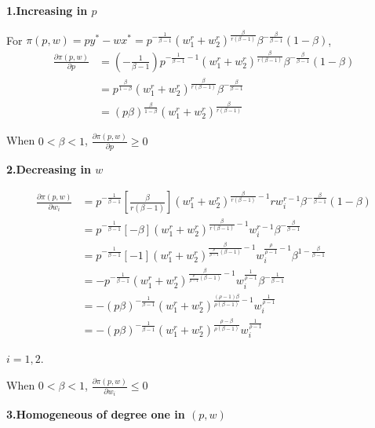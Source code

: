 \documentclass{article}
\begin{document}
\textbf{1.Increasing in $p$}

For $\pi(p,w) = py^* - wx^* = p^{-\frac{1}{\beta - 1}} (w_1^r + w_2^r)^{\frac{\beta}{r(\beta - 1)}}\beta^{-\frac{\beta}{\beta - 1}}(1-\beta)$,
\begin{align*}
\frac{\partial \pi(p, w)}{\partial p} &= (-\frac{1}{\beta - 1})p^{-\frac{1}{\beta - 1}-1} (w_1^r + w_2^r)^{\frac{\beta}{r(\beta - 1)}}\beta^{-\frac{\beta}{\beta - 1}}(1-\beta) \\
&= p^{\frac{\beta}{1 - \beta}} (w_1^r + w_2^r)^{\frac{\beta}{r(\beta - 1)}}\beta^{-\frac{\beta}{\beta - 1}} \\
&= (p\beta)^{\frac{\beta}{1 - \beta}} (w_1^r + w_2^r)^{\frac{\beta}{r(\beta - 1)}}
\end{align*}

When $0<\beta <1$, $\frac{\partial \pi(p, w)}{\partial p} \ge 0 $

\vspace{3mm}
\textbf{2.Decreasing in $w$}

\begin{align*}
\frac{\partial \pi(p, w)}{\partial w_i} &= 
p^{-\frac{1}{\beta - 1}} [\frac{\beta}{r(\beta - 1)}](w_1^r + w_2^r)^{\frac{\beta}{r(\beta - 1)} -1} r w_i^{r-1}\beta^{-\frac{\beta}{\beta - 1}}(1-\beta) \\
&= p^{-\frac{1}{\beta - 1}} [-\beta](w_1^r + w_2^r)^{\frac{\beta}{r(\beta - 1)} -1} w_i^{r-1}\beta^{-\frac{\beta}{\beta - 1}} \\
&= p^{-\frac{1}{\beta - 1}} [-1](w_1^r + w_2^r)^{\frac{\beta}{\frac{\rho}{\rho -1}(\beta - 1)} -1} w_i^{\frac{\rho}{\rho -1}-1}\beta^{1-\frac{\beta}{\beta - 1}} \\
&= -p^{-\frac{1}{\beta - 1}}(w_1^r + w_2^r)^{\frac{\beta}{\frac{\rho}{\rho -1}(\beta - 1)} -1} w_i^{\frac{1}{\rho -1}}\beta^{-\frac{1}{\beta - 1}} \\
&= -(p\beta)^{-\frac{1}{\beta - 1}}(w_1^r + w_2^r)^{\frac{(\rho -1)\beta}{\rho(\beta - 1)} -1} w_i^{\frac{1}{\rho -1}}\\
&= -(p\beta)^{-\frac{1}{\beta - 1}}(w_1^r + w_2^r)^{\frac{\rho -\beta}{\rho(\beta-1)} }w_i^{\frac{1}{\rho -1}}
\end{align*}

$i = 1,2$.

When $0<\beta <1$, $\frac{\partial \pi(p, w)}{\partial w_i} \le 0 $

\vspace{3mm}
\textbf{3.Homogeneous of degree one in $(p,w)$}
\end{document}

